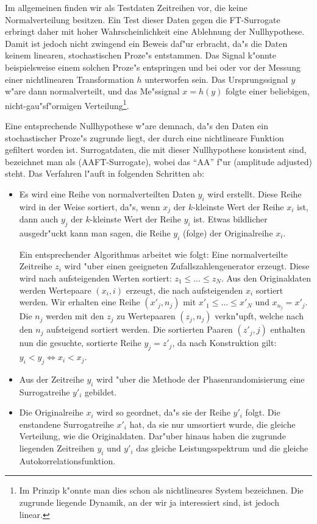 Im allgemeinen finden wir als Testdaten Zeitreihen vor, die keine Normalverteilung
besitzen.  Ein Test dieser Daten gegen die FT-Surrogate erbringt daher mit hoher
Wahrscheinlichkeit eine Ablehnung der Nullhypothese.  Damit ist jedoch nicht zwingend ein
Beweis daf"ur erbracht, da"s die Daten keinem linearen, stochastischen Proze"s entstammen.
Das Signal k"onnte beispielsweise einem solchen Proze"s entspringen und bei oder vor der
Messung einer nichtlinearen Transformation $h$ unterworfen sein.  Das Ursprungssignal $y$
w"are dann normalverteilt, und das Me"ssignal $x=h(y)$ folgte einer beliebigen,
nicht-gau"sf"ormigen Verteilung\footnote{Im Prinzip k"onnte man dies schon als
  nichtlineares System bezeichnen. Die zugrunde liegende Dynamik, an der wir ja
  interessiert sind, ist jedoch linear.}.

Eine entsprechende Nullhypothese w"are demnach, da"s den Daten ein stochastischer Proze"s
zugrunde liegt, der durch eine nichtlineare Funktion gefiltert worden ist. Surrogatdaten, die
mit dieser Nullhypothese konsistent sind, bezeichnet man als \begriff(AAFT-Surrogate),
wobei das ``AA'' f"ur \begriff(amplitude adjusted) steht.  
Das Verfahren l"auft in  folgenden Schritten ab:
\begin{itemize}
\item Es wird eine Reihe von normalverteilten Daten $y_i$ wird erstellt. Diese Reihe wird
  in der Weise  sortiert, da"s, wenn $x_j$ der $k$-kleinste Wert der Reihe $x_i$ ist, dann
  auch $y_j$ der $k$-kleinste Wert der Reihe $y_i$ ist. Etwas bildlicher ausgedr"uckt
  kann man sagen, die Reihe $y_i$ \naja(folge) der Originalreihe $x_i$.
  
  Ein entsprechender Algorithmus arbeitet wie folgt:  Eine normalverteilte Zeitreihe $z_i$
  wird "uber einen geeigneten Zufallszahlengenerator erzeugt. Diese wird nach
  aufsteigenden Werten sortiert: $z_1\leq\dots\leq z_N$.  Aus den Originaldaten werden
  Wertepaare $(x_i,i)$ erzeugt, die nach aufsteigenden $x_i$ sortiert werden. Wir
  erhalten eine Reihe $(x'_j,n_j)$ mit $x'_1\leq\dots\leq x'_N$ und $x_{n_j}=x'_j$. Die
  $n_j$ werden mit den $z_j$ zu Wertepaaren $(z_j,n_j)$ verkn"upft, welche nach
  den $n_j$ aufsteigend sortiert werden. Die sortierten Paaren $(z'_j,j)$ enthalten nun die
  gesuchte, sortierte Reihe $y_j=z'_j$, da nach Konstruktion gilt: $y_i<y_j\Leftrightarrow
  x_i<x_j$.
\item Aus der Zeitreihe $y_i$ wird "uber die Methode der Phasenrandomisierung eine
  Surrogatreihe $y'_i$ gebildet. 
\item Die Originalreihe $x_i$ wird so geordnet, da"s sie der Reihe $y'_i$ folgt. Die
  enstandene Surrogatreihe $x'_i$ hat, da sie nur umsortiert wurde, die gleiche
  Verteilung, wie die Originaldaten. Dar"uber hinaus haben die zugrunde liegenden
  Zeitreihen $y_i$ und $y'_i$ das gleiche Leistungsspektrum und die gleiche Autokorrelationsfunktion.
\end{itemize}
